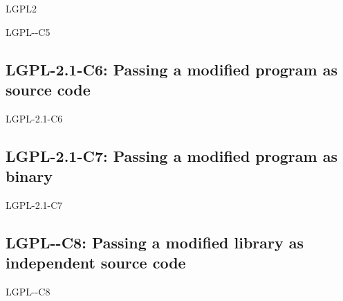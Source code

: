 \begin{license}{LGPL2}
\begin{lsuc}{LGPL-\ver-C5}
  \lsucprohibitsnothing
\end{lsuc}


\subsection{LGPL-2.1-C6: Passing a modified program as source code}
\begin{lsuc}{LGPL-2.1-C6}
  
  \useCaseSix

  \begin{lsucrequires}
    \lsucmandatory{\relicenseUnderGPL}
  \end{lsucrequires}

  \begin{lsucprohibits}
    \lsucitem{\dontDistributeProgram}\mustBeALibrary
  \end{lsucprohibits}

\end{lsuc}

\subsection{LGPL-2.1-C7: Passing a modified program as binary}
\begin{lsuc}{LGPL-2.1-C7}

  \useCaseSeven

  \begin{lsucrequires}
    \lsucmandatory{\relicenseUnderGPL}
  \end{lsucrequires}

  \begin{lsucprohibits}
    \lsucitem{\dontDistributeProgram}\mustBeALibrary
  \end{lsucprohibits}

\end{lsuc}

\subsection{LGPL-\ver-C8: Passing a modified library as independent source code}
\begin{lsuc}{LGPL-\ver-C8}

  \useCaseEight


\end{lsuc}
\end{license}
